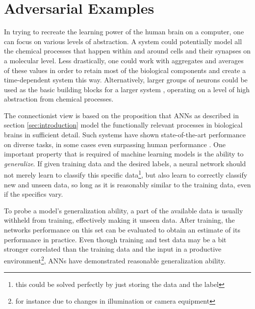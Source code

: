\documentclass[11pt, a4paper]{article}
\begin{document}










\section{Adversarial Examples}
\label{sec:adversarial-examples}

In trying to recreate the learning power of the human brain on a computer, one can focus on various levels of abstraction. A system could potentially model all the chemical processes that happen within and around cells and their synapses on a molecular level. Less drastically, one could work with aggregates and averages of these values in order to retain most of the biological components and create a time-dependent system this way. Alternatively, larger groups of neurons could be used as the basic building blocks for a larger system \cite{dynamic-field-theory-movement-preparation}, operating on a level of high abstraction from chemical processes.

The connectionist view is based on the proposition that ANNs as described in section \ref{sec:introduction} model the functionally relevant processes in biological brains in sufficient detail. Such systems have shown state-of-the-art performance on diverse tasks, in some cases even surpassing human performance \cite{multi-column-deep-networks-image-classification}. One important property that is required of machine learning models is the ability to \emph{generalize}. If given training data and the desired labels, a neural network should not merely learn to classify this specific data\footnote{this could be solved perfectly by just storing the data and the label}, but also learn to correctly classify new and unseen data, so long as it is reasonably similar to the training data, even if the specifics vary.

To probe a model's generalization ability, a part of the available data is usually withheld from training, effectively making it unseen data. After training, the networks performance on this set can be evaluated to obtain an estimate of its performance in practice. Even though training and test data may be a bit stronger correlated than the training data and the input in a productive environment\footnote{for instance due to changes in illumination or camera equipment}, ANNs have demonstrated reasonable generalization ability.
\end{document}
